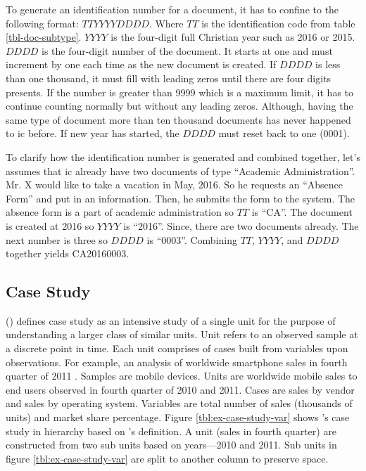 To generate an identification number for a document, it has to confine to the following format: $TTYYYYDDDD$.
Where $TT$ is the identification code from table \ref{tbl-doc-subtype}.
$YYYY$ is the four-digit full Christian year such as 2016 or 2015.
$DDDD$ is the four-digit number of the document.
It starts at one and must increment by one each time as the new document is created.
If $DDDD$ is less than one thousand, it must fill with leading zeros until there are four digits presents.
If the number is greater than 9999 which is a maximum limit, it has to continue counting normally but without any leading zeros.
Although, having the same type of document more than ten thousand documents has never happened to \gls{ic} before.
If new year has started, the $DDDD$ must reset back to one (0001).

To clarify how the identification number is generated and combined together, let's assumes that \gls{ic} already have two documents of type \enquote{Academic Administration}.
Mr. X would like to take a vacation in May, 2016.
So he requests an \enquote{Absence Form} and put in an information.
Then, he submits the form to the system.
The absence form is a part of academic administration so $TT$ is \enquote{CA}.
The document is created at 2016 so $YYYY$ is \enquote{2016}.
Since, there are two documents already.
The next number is three so $DDDD$ is \enquote{0003}.
Combining $TT$, $YYYY$, and $DDDD$ together yields CA20160003.

\subsection{Case Study}
\citeauthor{merriam1988case} (\citeyear{merriam1988case}) defines case study as an intensive study of a single unit for the purpose of understanding a larger class of similar units.
Unit refers to an observed sample at a discrete point in time.
Each unit comprises of cases built from variables upon observations.
For example, an analysis of worldwide smartphone sales in fourth quarter of 2011 \cite{goasduff2012gartner}.
Samples are mobile devices.
Units are worldwide mobile sales to end users observed in fourth quarter of 2010 and 2011.
Cases are sales by vendor and sales by operating system.
Variables are total number of sales (thousands of units) and market share percentage.
Figure \ref{tbl:ex-case-study-var} shows \citeauthor{goasduff2012gartner}'s case study \cite{goasduff2012gartner} in hierarchy based on \citeauthor{merriam1988case}'s definition.
A unit (sales in fourth quarter) are constructed from two sub units based on years---2010 and 2011.
Sub units in figure \ref{tbl:ex-case-study-var} are split to another column to preserve space.

